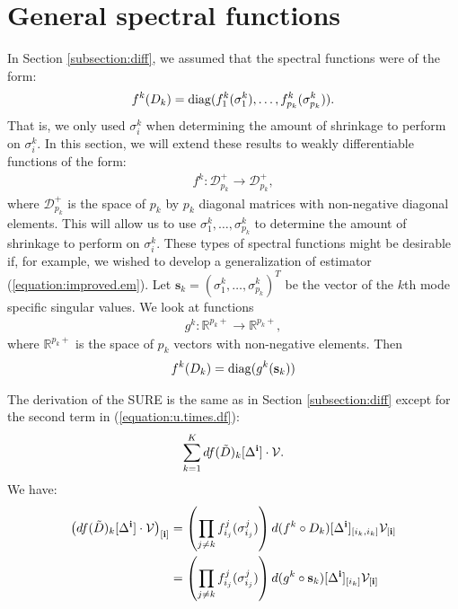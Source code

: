 \section{General spectral functions}
\label{sec:gen.spec.func}
In Section \ref{subsection:diff}, we assumed that the spectral
functions were of the form:
\begin{align*}
  f^k(D_k) = \operatorname*{diag}(f_1^k(\sigma_1^k),\ldots,f_{p_k}^k(\sigma_{p_k}^k)).
\end{align*}
That is, we only used $\sigma_i^k$ when determining the amount of
shrinkage to perform on $\sigma_i^k$. In this section, we will extend
these results to weakly differentiable functions of the form:
\begin{align*}
  f^k: \mathcal{D}_{p_k}^+ \rightarrow \mathcal{D}_{p_k}^+,
\end{align*}
where $\mathcal{D}_{p_k}^+$ is the space of $p_k$ by $p_k$ diagonal
matrices with non-negative diagonal elements. This will allow us to
use $\sigma_1^k,\ldots,\sigma_{p_k}^k$ to determine the amount of
shrinkage to perform on $\sigma_i^k$. These types of spectral
functions might be desirable if, for example, we wished to develop a
generalization of estimator (\ref{equation:improved.em}). Let
$\mathbf{s}_k = (\sigma_1^k,\ldots,\sigma_{p_k}^k)^T$ be the vector of
the $k$th mode specific singular values. We look at functions
\begin{align*}
  g^k: \mathbb{R}^{p_k+} \rightarrow \mathbb{R}^{p_k+},
\end{align*}
where $\mathbb{R}^{p_k+}$ is the space of $p_k$ vectors with
non-negative elements. Then
\begin{align*}
  f^k(D_k) = \operatorname*{diag}(g^k(\mathbf{s}_k))
\end{align*}

The derivation of the SURE is the same as in Section
\ref{subsection:diff} except for the second term in
(\ref{equation:u.times.df}):
\begin{align*}
  \sum_{k=1}^K df(\tilde{D})_k[\Delta^{\bf i}] \cdot \mathcal{V}.
\end{align*}
We have:
\begin{align}
  \left(df(\tilde{D})_k[\Delta^{\bf i}] \cdot
    \mathcal{V}\right)_{[\mathbf{i}]} &= \left(\prod_{j\neq
      k}f_{i_j}^j(\sigma_{i_j}^j)\right)d(f^k \circ D_k)[\Delta^{\bf
    i}]_{[i_k,i_k]}\mathcal{V}_{[\mathbf{i}]}\nonumber\\
  &= \left(\prod_{j\neq k}f_{i_j}^j(\sigma_{i_j}^j)\right)d(g^k \circ \mathbf{s}_k)[\Delta^{\bf i}]_{[i_k]}\mathcal{V}_{[\mathbf{i}]} \label{equation:g.circ.s}
\end{align}

